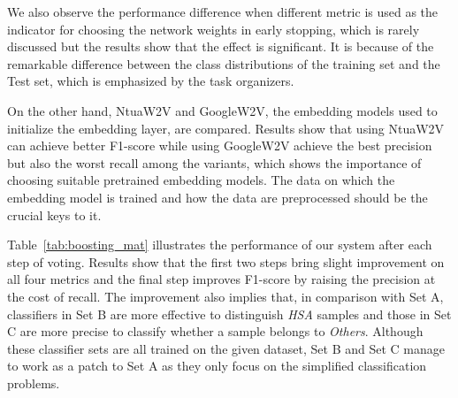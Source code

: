 \documentclass[11pt,a4paper]{article}
\begin{document}
We also observe the performance difference when different metric is used as the indicator for choosing the network weights in early stopping, which is rarely discussed but the results show that the effect is significant. It is because of the remarkable difference between the class distributions of the training set and the Test set, which is emphasized by the task organizers.

On the other hand, NtuaW2V and GoogleW2V, the embedding models used to initialize the embedding layer, are compared. Results show that using NtuaW2V can achieve better F1-score while using GoogleW2V achieve the best precision but also the worst recall among the variants, which shows the importance of choosing suitable pretrained embedding models. The data on which the embedding model is trained and how the data are preprocessed should be the crucial keys to it.


Table~\ref{tab:boosting_mat} illustrates the performance of our system after each step of voting. Results show that the first two steps bring slight improvement on all four metrics and the final step improves F1-score by raising the precision at the cost of recall. The improvement also implies that, in comparison with Set A, classifiers in Set B are more effective to distinguish {\em HSA} samples and those in Set C are more precise to classify whether a sample belongs to {\em Others}. Although these classifier sets are all trained on the given dataset, Set B and Set C manage to work as a patch to Set A as they only focus on the simplified classification problems.

\end{document}
